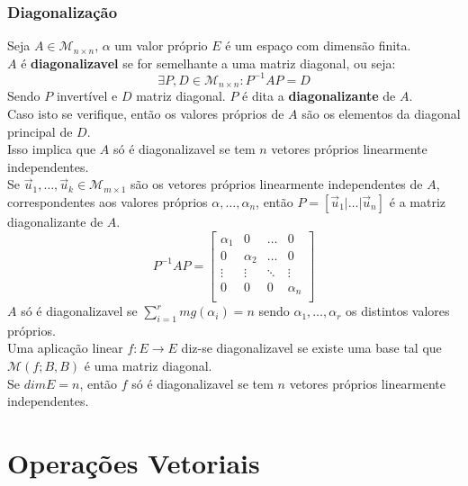 \documentclass[]{report}
\begin{document}
\subsection{Diagonalização}
Seja $A\in \mathcal{M}_{n \times n}$, $\alpha$ um valor próprio $E$ é um espaço com dimensão finita.\\[2mm]
$A$ é \textbf{diagonalizavel} se for semelhante a uma matriz diagonal, ou seja:
$$\exists P, D \in \mathcal{M}_{n \times n}: P^{-1}AP = D$$
Sendo $P$ invertível e $D$ matriz diagonal. $P$ é dita a \textbf{diagonalizante} de $A$.\\
Caso isto se verifique, então os valores próprios de $A$ são os elementos da diagonal principal de $D$.\\
Isso implica que $A$ só é diagonalizavel se tem $n$ vetores próprios linearmente independentes.\\[5mm]
Se $\vec u_1, \dots, \vec u_k \in \mathcal{M}_{m \times 1}$ são os vetores próprios linearmente independentes de $A$, correspondentes aos valores próprios $\alpha, \dots, \alpha_n$, então $P = [\vec u_1 | \dots | \vec u_n] $ é a matriz diagonalizante de $A$.
$$P^{-1}AP =
\begin{bmatrix}
\alpha_1 & 0 & \dots & 0 \\
0 & \alpha_2 & \dots & 0 \\
\vdots & \vdots & \ddots & \vdots \\
0 & 0 & 0 & \alpha_n \\
\end{bmatrix}$$
$A$ só é diagonalizavel se $\sum_{i=1}^r mg(\alpha_i) = n$ sendo $\alpha_1, \dots, \alpha_r$ os distintos valores próprios.\\[5mm]
Uma aplicação linear $f: E \to E$ diz-se diagonalizavel se existe uma base tal que $\mathcal{M}(f; B, B)$ é uma matriz diagonal.\\
Se $dim E = n$, então $f$ só é diagonalizavel se tem $n$ vetores próprios linearmente independentes.
\chapter{Operações Vetoriais}
\end{document}
